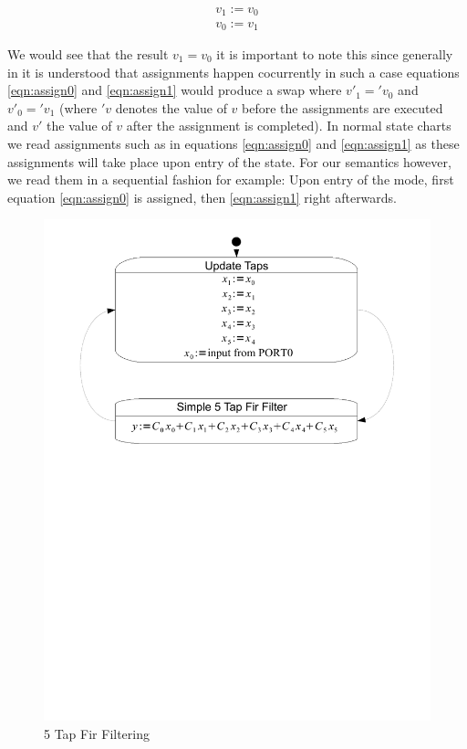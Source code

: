 \begin{align}
v_1 := v_0 \label{eqn:assign0} \\ 
v_0 := v_1 \label{eqn:assign1}
\end{align}

We would see that the result $v_1 = v_0$ it is important to note this since generally in \cite{StateChartVis}  it is understood that assignments happen cocurrently in such a case equations \ref{eqn:assign0} and \ref{eqn:assign1} would produce a swap where $v'_1 = 'v_0$ and $v'_0 = 'v_1$ (where $'v$ denotes the value of $v$ before the assignments are executed and $v'$ the value of $v$ after the assignment is completed). In normal state charts we read assignments such as in equations \ref{eqn:assign0} and \ref{eqn:assign1} as these assignments will take place upon entry of the state. For our semantics however, we read them in a sequential fashion for example: Upon entry of the mode, first equation \ref{eqn:assign0} is assigned, then \ref{eqn:assign1} right afterwards.

\begin{figure}[htp]
    \centering
    \includegraphics[trim= 10mm 145mm 10mm 10mm, clip, width=\imgmedium]{./images/state_uml2_fir.pdf}
    \caption{5 Tap Fir Filtering}
    \label{fig:state_uml2_fir}
\end{figure}

